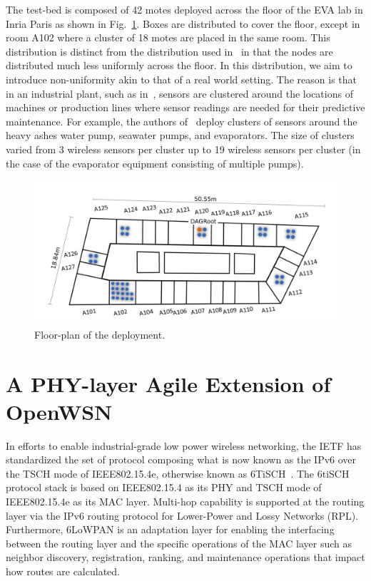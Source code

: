\documentclass[journal,article,submit,moreauthors,pdftex]{Definitions/mdpi}
\begin{document}

The test-bed is composed of 42 motes deployed across the floor of the EVA lab in Inria Paris as shown in Fig.~\ref{fig:building_motes}.
Boxes are distributed to cover the floor, except in room A102 where a cluster of 18 motes are placed in the same room.
This distribution is distinct from the distribution used in~\cite{brachmann19ieee} in that the nodes are distributed much less uniformly across the floor. 
In this distribution, we aim to introduce non-uniformity akin to that of a real world setting.
The reason is that in an industrial plant, such as in~\cite{civerchia17industrial}, sensors are clustered around the locations of machines or production lines where sensor readings are needed for their predictive maintenance.
For example, the authors of~\cite{civerchia17industrial} deploy clusters of sensors around the heavy ashes water pump, seawater pumps, and evaporators. 
The size of clusters varied from 3 wireless sensors per cluster up to 19 wireless sensors per cluster (in the case of the evaporator equipment consisting of multiple pumps). 

\begin{figure}
	\centering
	\includegraphics[width=1\columnwidth]{building_motes}
	\caption{Floor-plan of the deployment.}
    \label{fig:building_motes}
\end{figure}

\section{A PHY-layer Agile Extension of OpenWSN}
\label{sec:openwsn}


In efforts to enable industrial-grade low power wireless networking, the IETF has standardized the set of protocol composing what is now known as the IPv6 over the TSCH mode of IEEE802.15.4e, otherwise known as 6TiSCH~\cite{vilajosana21ietf}.
The 6tiSCH protocol stack is based on IEEE802.15.4 as its PHY and TSCH mode of IEEE802.15.4e as its MAC layer.
Multi-hop capability is supported at the routing layer via the IPv6 routing protocol for Lower-Power and Lossy Networks (RPL). 
Furthermore, 6LoWPAN is an adaptation layer for enabling the interfacing between the routing layer and the specific operations of the MAC layer such as neighbor discovery, registration, ranking, and maintenance operations that impact how routes are calculated. 
\end{document}
